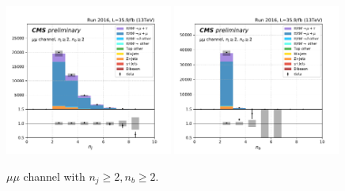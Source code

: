 \begin{figure}[ht]
    \includegraphics[width=0.49\textwidth]{chapters/Analysis/sectionPlots/figures/kinematics_pickles/mumu/2b/mumu_2b_nJets.pdf}
    \includegraphics[width=0.49\textwidth]{chapters/Analysis/sectionPlots/figures/kinematics_pickles/mumu/2b/mumu_2b_nBJets.pdf}
    
    \caption{$\mu\mu$ channel with $n_j\geq2, n_b\geq2$.}
\end{figure}


